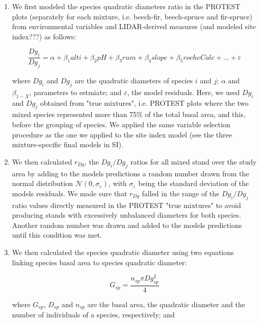 \documentclass[a4paper]{article}
\begin{document}
\begin{enumerate}

  \item We first modeled the species quadratic diameters ratio in the PROTEST plots (separately for each mixture, i.e. beech-fir, beech-spruce and fir-spruce) from environmental variables and LIDAR-derived measures (and modeled site index???) as follows:

  \begin{equation}\label{DgModel}
    \frac{Dg_i}{Dg_j} = \alpha + \beta_1 alti + \beta_2 pH +\beta_3 rum +\beta_4 slope +\beta_5 rocheCalc+...+\varepsilon
  \end{equation}

  where $Dg_i$ and $Dg_j$ are the quadratic diameters of species $i$ and $j$; $\alpha$ and $\beta_{1-X}$, parameters to estmiate; and $\varepsilon$, the model residuals. Here, we used $Dg_i$ and $Dg_j$ obtained from "true mixtures", i.e. PROTEST plots where the two mixed species represented more than 75\% of the total basal area, and this, before the grouping of species. We applied the same variable selection procedure as the one we applied to the site index model (see the three mixture-specific final models in SI).

  \item We then calculated $r_{Dg}$, the $Dg_i / Dg_j$ ratios for all mixed stand over the study area by adding to the models predictions a random number drawn from the normal distribution $\mathcal{N} (0, \sigma_\varepsilon)$, with $\sigma_\varepsilon$ being the standard deviation of the models residuals. We made sure that $r_{Dg}$ falled in the range of the $Dg_i / Dg_j$ ratio values directly measured in the PROTEST "true mixtures" to avoid producing stands with excessively unbalanced diameters for both species. Another random number was drawn and added to the models predictions until this condition was met.

  \item We then calculated the species quadratic diameter using two equations linking species basal area to species quadratic diameter:

  \begin{equation}\label{Gsp}
    G_{sp} = \frac{n_{sp}\pi Dg_{sp}^2}{4}
  \end{equation}

  where $G_{sp}$, $D_{sp}$ and $n_{sp}$ are the basal area, the quadratic diameter and the number of individuals of a species, respectively; and


\end{enumerate}
\end{document}
